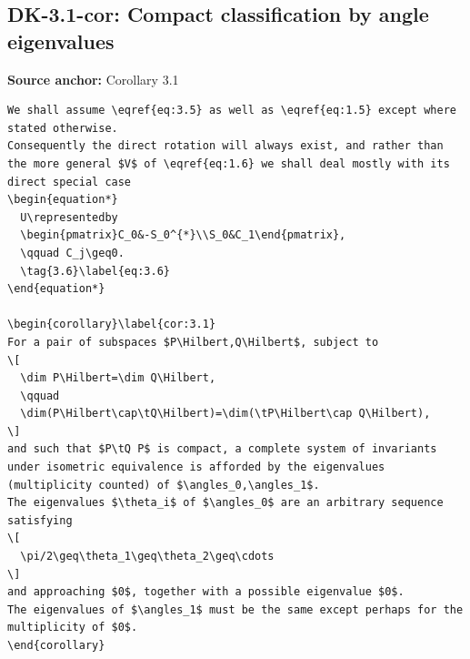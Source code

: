 \subsection*{DK-3.1-cor: Compact classification by angle eigenvalues}
\noindent\textbf{Source anchor:} Corollary 3.1\\
\begin{verbatim}
We shall assume \eqref{eq:3.5} as well as \eqref{eq:1.5} except where stated otherwise.
Consequently the direct rotation will always exist, and rather than the more general $V$ of \eqref{eq:1.6} we shall deal mostly with its direct special case
\begin{equation*}
  U\representedby
  \begin{pmatrix}C_0&-S_0^{*}\\S_0&C_1\end{pmatrix},
  \qquad C_j\geq0.
  \tag{3.6}\label{eq:3.6}
\end{equation*}

\begin{corollary}\label{cor:3.1}
For a pair of subspaces $P\Hilbert,Q\Hilbert$, subject to
\[
  \dim P\Hilbert=\dim Q\Hilbert,
  \qquad
  \dim(P\Hilbert\cap\tQ\Hilbert)=\dim(\tP\Hilbert\cap Q\Hilbert),
\]
and such that $P\tQ P$ is compact, a complete system of invariants under isometric equivalence is afforded by the eigenvalues (multiplicity counted) of $\angles_0,\angles_1$.
The eigenvalues $\theta_i$ of $\angles_0$ are an arbitrary sequence satisfying
\[
  \pi/2\geq\theta_1\geq\theta_2\geq\cdots
\]
and approaching $0$, together with a possible eigenvalue $0$.
The eigenvalues of $\angles_1$ must be the same except perhaps for the multiplicity of $0$.
\end{corollary}
\end{verbatim}

